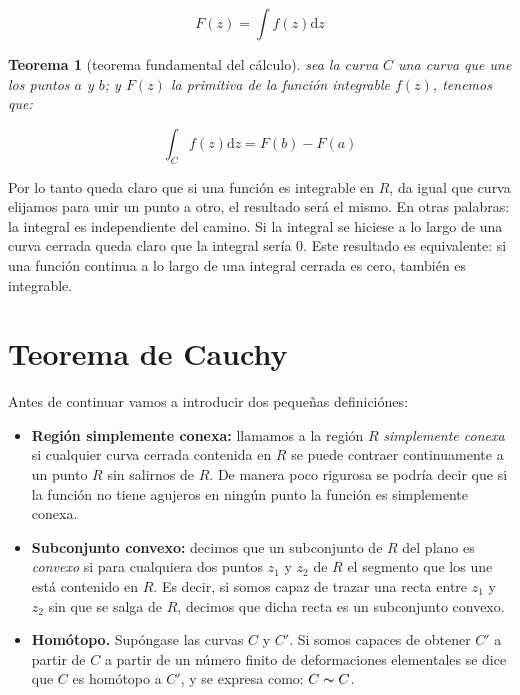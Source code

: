 \documentclass[12pt]{book}
\newcommand{\D}{\mathrm{d}}
\newtheorem{theorem}{Teorema}[section]
\begin{document}
\begin{equation}
F(z) = \int f(z) \D z
\end{equation}

\begin{theorem}[teorema fundamental del cálculo] 
sea la curva $C$ una curva que une los puntos $a$ y $b$; y $F(z)$ la primitiva de la función integrable $f(z)$, tenemos que:

$$ \int_C f(z) \D z = F(b) - F(a) $$

\end{theorem}

Por lo tanto queda claro que si una función es integrable en $R$, da igual que curva elijamos para unir un punto a otro, el resultado será el mismo. En otras palabras: la integral es independiente del camino. Si la integral se hiciese a lo largo de una curva cerrada queda claro que la integral sería 0. Este resultado es equivalente: si una función continua a lo largo de una integral cerrada es cero, también es integrable. \\ %

\section{Teorema de Cauchy}

Antes de continuar vamos a introducir dos pequeñas definiciónes: 

\begin{itemize}
\item \textbf{Región simplemente conexa:} llamamos a la región $R$ \textit{simplemente conexa} si cualquier curva cerrada contenida en $R$ se puede contraer continuamente a un punto $R$ sin salirnos de $R$. De manera poco rigurosa se podría decir que si la función no tiene agujeros en ningún punto la función es simplemente conexa. %

\item \textbf{Subconjunto convexo:} decimos que un subconjunto de $R$ del plano es \textit{convexo} si para cualquiera dos puntos $z_1$ y $z_2$ de $R$ el segmento que los une está contenido en $R$. Es decir, si somos capaz de trazar una recta entre $z_1$ y $z_2$ sin que se salga de $R$, decimos que dicha recta es un subconjunto convexo. %

\item \textbf{Homótopo.} Supóngase las curvas $C$ y $C'$. Si somos capaces de obtener $C'$ a partir de $C$ a partir de un número finito de deformaciones elementales se dice que $C$ es homótopo a $C'$, y se expresa como: $C \thicksim C$.  %

\end{itemize}
\end{document}
